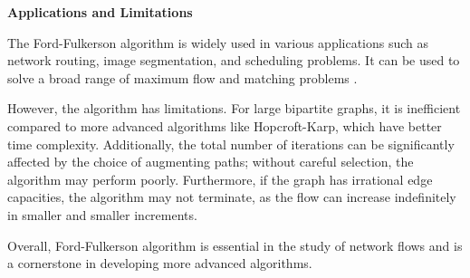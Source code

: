 \textbf{Applications and Limitations}

The Ford-Fulkerson algorithm is widely used in various applications such as network routing, image segmentation, and scheduling problems. It can be used to solve a broad range of maximum flow and matching problems \cite{ahuja}.

However, the algorithm has limitations. For large bipartite graphs, it is inefficient compared to more advanced algorithms like Hopcroft-Karp, which have better time complexity. Additionally, the total number of iterations can be significantly affected by the choice of augmenting paths; without careful selection, the algorithm may perform poorly. Furthermore, if the graph has irrational edge capacities, the algorithm may not terminate, as the flow can increase indefinitely in smaller and smaller increments.

Overall, Ford-Fulkerson algorithm is essential in the study of network flows and is a cornerstone in developing more advanced algorithms.

